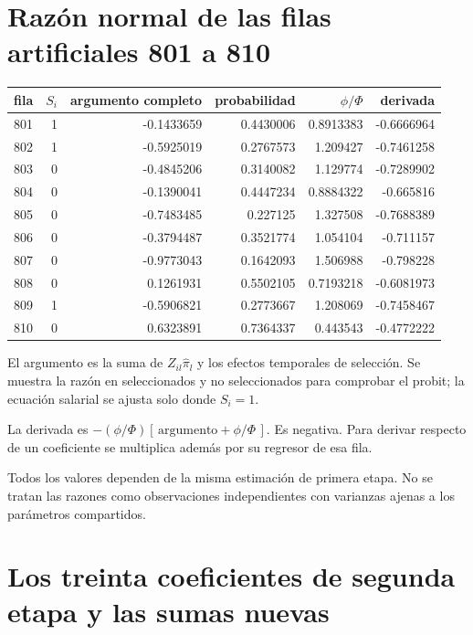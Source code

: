 \documentclass[11pt,a4paper]{article}
\begin{document}
\clearpage
\section{Razón normal de las filas artificiales 801 a 810}

\begin{center}\small
\begin{tabular}{lrrrrr}
\toprule
fila & $S_i$ & argumento completo & probabilidad & $\phi/\Phi$ & derivada\\\midrule
801 & 1 & -0.1433659 & 0.4430006 & 0.8913383 & -0.6666964\\
802 & 1 & -0.5925019 & 0.2767573 & 1.209427 & -0.7461258\\
803 & 0 & -0.4845206 & 0.3140082 & 1.129774 & -0.7289902\\
804 & 0 & -0.1390041 & 0.4447234 & 0.8884322 & -0.665816\\
805 & 0 & -0.7483485 & 0.227125 & 1.327508 & -0.7688389\\
806 & 0 & -0.3794487 & 0.3521774 & 1.054104 & -0.711157\\
807 & 0 & -0.9773043 & 0.1642093 & 1.506988 & -0.798228\\
808 & 0 & 0.1261931 & 0.5502105 & 0.7193218 & -0.6081973\\
809 & 1 & -0.5906821 & 0.2773667 & 1.208069 & -0.7458467\\
810 & 0 & 0.6323891 & 0.7364337 & 0.443543 & -0.4772222\\
\bottomrule
\end{tabular}\end{center}

El argumento es la suma de $Z_{il}\widehat\pi_l$ y los efectos temporales de selección. Se muestra la razón en seleccionados y no seleccionados para comprobar el probit; la ecuación salarial se ajusta solo donde $S_i=1$.

La derivada es $-(\phi/\Phi)[\,\text{argumento}+\phi/\Phi\,]$. Es negativa. Para derivar respecto de un coeficiente se multiplica además por su regresor de esa fila.

Todos los valores dependen de la misma estimación de primera etapa. No se tratan las razones como observaciones independientes con varianzas ajenas a los parámetros compartidos.

\clearpage
\section{Los treinta coeficientes de segunda etapa y las sumas nuevas}
\end{document}
